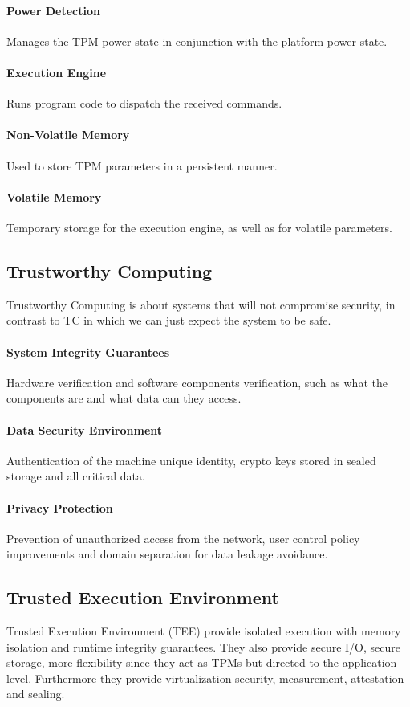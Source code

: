 \paragraph{Power Detection}
Manages the TPM power state in conjunction with the platform power state.
\paragraph{Execution Engine}
Runs program code to dispatch the received commands.
\paragraph{Non-Volatile Memory}
Used to store TPM parameters in a persistent manner.
\paragraph{Volatile Memory}
Temporary storage for the execution engine, as well as for volatile parameters.

\subsection{Trustworthy Computing}
Trustworthy Computing is about systems that will not compromise security,
in contrast to TC in which we can just expect the system to be safe.
\paragraph{System Integrity Guarantees}
Hardware verification and software components verification, such as what the components are and what data can they access.
\paragraph{Data Security Environment}
Authentication of the machine unique identity, crypto keys stored in sealed storage and all critical data.
\paragraph{Privacy Protection}
Prevention of unauthorized access from the network, user control policy improvements and domain separation for data leakage avoidance.

\subsection{Trusted Execution Environment}
Trusted Execution Environment (TEE) provide isolated execution with memory isolation and runtime integrity guarantees.
They also provide secure I/O, secure storage,
more flexibility since they act as TPMs but directed to the application-level.
Furthermore they provide virtualization security, measurement, attestation and sealing.

